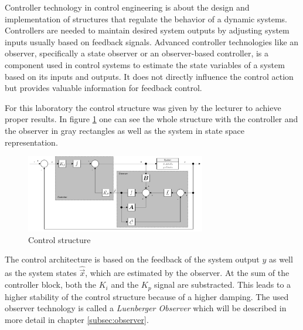 Controller technology in control engineering is about the design and implementation of structures that regulate the behavior of a dynamic systems. Controllers are needed to maintain desired system outputs by adjusting system inputs usually based on feedback signals. Advanced controller technologies like an observer, specifically a state observer or an observer-based controller, is a component used in control systems to estimate the state variables of a system based on its inputs and outputs. It does not directly influence the control action but provides valuable information for feedback control.

For this laboratory the control structure was given by the lecturer to achieve proper results. In figure \ref{fig:controlStruct} one can see the whole structure with the controller and the observer in gray rectangles as well as the system in state space representation.

\FloatBarrier
\begin{figure}[ht]
	\begin{center}
		\includegraphics[clip, trim=0cm 0cm 0cm 0cm, width=0.7\textwidth]{figure/controllerTechnology.pdf}
		\caption[Control structure]{Control structure}
		\label{fig:controlStruct}
	\end{center}
\end{figure}
\FloatBarrier

The control architecture is based on the feedback of the system output $y$ as well as the system states $\hat{\Vec{x}}$, which are estimated by the observer. At the sum of the controller block, both the $K_i$ and the $K_p$ signal are substracted. This leads to a higher stability of the control structure because of a higher damping. The used observer technology is called a \textit{Luenberger Observer} which will be described in more detail in chapter \ref{subsec:observer}.

